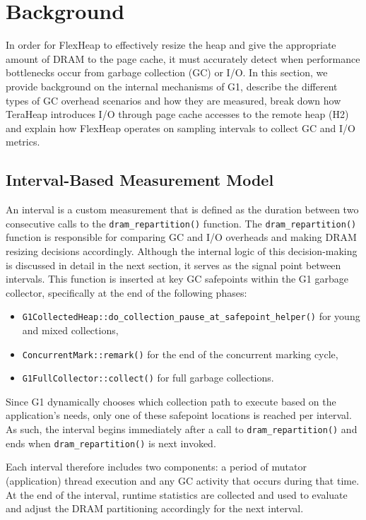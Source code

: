 \section{Background}
In order for FlexHeap to effectively resize 
the heap and give the appropriate amount of DRAM to the page 
cache, it must accurately detect when performance bottlenecks occur
from garbage collection (GC) or I/O. 
In this section, we provide background on the 
internal mechanisms of G1, describe the different types of GC overhead scenarios and how they 
are measured, break down how TeraHeap introduces I/O through page cache accesses to the remote heap (H2) 
and explain how FlexHeap operates on sampling intervals to collect GC and I/O metrics.
\subsection{Interval-Based Measurement Model}

An interval is a custom measurement that is defined as the duration between two consecutive calls to the \texttt{dram\_repartition()} function.
The \texttt{dram\_repartition()} function is responsible for comparing GC and I/O overheads
and making DRAM resizing decisions accordingly. Although the internal logic of this decision-making is discussed in detail 
in the next section, it serves as the signal point between intervals. 
This function is inserted at key GC safepoints within the G1 garbage collector, specifically at the end of the following phases: 

\begin{itemize}
  \item \texttt{G1CollectedHeap::do\allowbreak\_collection\allowbreak\_pause\allowbreak\_at\allowbreak\_safepoint\allowbreak\_helper()} for young and mixed collections,
  \item \texttt{ConcurrentMark::remark()} for the end of the concurrent marking cycle,
  \item \texttt{G1FullCollector::collect()} for full garbage collections.
\end{itemize}

Since G1 dynamically chooses which collection path to execute based on the application's needs, only one of these safepoint 
locations is reached per interval. As such, the interval begins immediately after a call to \texttt{dram\_repartition()} 
and ends when \texttt{dram\_repartition()} is next invoked.

Each interval therefore includes two components: a period of mutator (application) thread execution 
and any GC activity that occurs during that time. At the end of the interval, runtime statistics are 
collected and used to evaluate and adjust the 
DRAM partitioning accordingly for the next interval.


